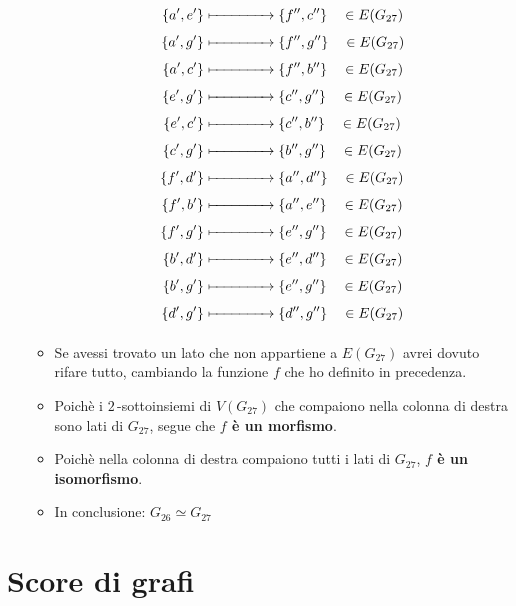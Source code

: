 \documentclass[10pt]{article}
\begin{document}
\begin{itemize}
\begin{itemize}
\begin{equation}
\begin{split}
		\{a',e' \} & \xmapsto[\text{\quad\,\quad\quad\quad\quad}]{\text{}} \{f'',c'' \} \quad \in E(G_{27}) \\
		\{a',g'\} & \xmapsto[\text{\quad\,\quad\quad\quad\quad}]{\text{}} \{f'',g''\} \quad \in E(G_{27}) \\		
		\{a',c'\} & \xmapsto[\text{\quad\,\quad\quad\quad\quad}]{\text{}} \{f'',b''\} \quad \in E(G_{27}) \\
		\{e',g'\} & \xmapsto[\text{\quad\,\quad\quad\quad\quad}]{\text{}} \{c'',g''\} \quad \in E(G_{27}) \\
		\{e',c'\} & \xmapsto[\text{\quad\,\quad\quad\quad\quad}]{\text{}} \{c'',b''\} \quad \in E(G_{27}) \\
		\{c',g'\} & \xmapsto[\text{\quad\,\quad\quad\quad\quad}]{\text{}} \{b'',g''\} \quad \in E(G_{27}) \\
		\{f',d'\} & \xmapsto[\text{\quad\,\quad\quad\quad\quad}]{\text{}} \{a'',d''\} \quad \in E(G_{27}) \\	
		\{f',b'\} & \xmapsto[\text{\quad\,\quad\quad\quad\quad}]{\text{}} \{a'',e''\} \quad \in E(G_{27}) \\
		\{f',g'\} & \xmapsto[\text{\quad\,\quad\quad\quad\quad}]{\text{}} \{e'',g''\} \quad \in E(G_{27}) \\
		\{b',d'\} & \xmapsto[\text{\quad\,\quad\quad\quad\quad}]{\text{}} \{e'',d''\} \quad \in E(G_{27}) \\
		\{b',g'\} & \xmapsto[\text{\quad\,\quad\quad\quad\quad}]{\text{}} \{e'',g''\} \quad \in E(G_{27}) \\
		\{d',g'\} & \xmapsto[\text{\quad\,\quad\quad\quad\quad}]{\text{}} \{d'',g''\} \quad \in E(G_{27})
		\notag
	\end{split}
	\end{equation}
	\item
	Se avessi trovato un lato che non appartiene a $E(G_{27})$ avrei dovuto rifare tutto, cambiando la funzione $f$ che ho definito in precedenza.
	\item
	Poichè i $2\,$-sottoinsiemi di $V(G_{27})$ che compaiono nella colonna di destra sono lati di $G_{27}$, segue che \textbf{$f$ è un morfismo}.
	\item
	Poichè nella colonna di destra compaiono tutti i lati di $G_{27}$, \textbf{$f$ è un isomorfismo}.
	\item
	In conclusione: $G_{26} \simeq G_{27}$
	\end{itemize}
	\end{itemize}
	
	\newpage
	\section{Score di grafi}
\end{document}
